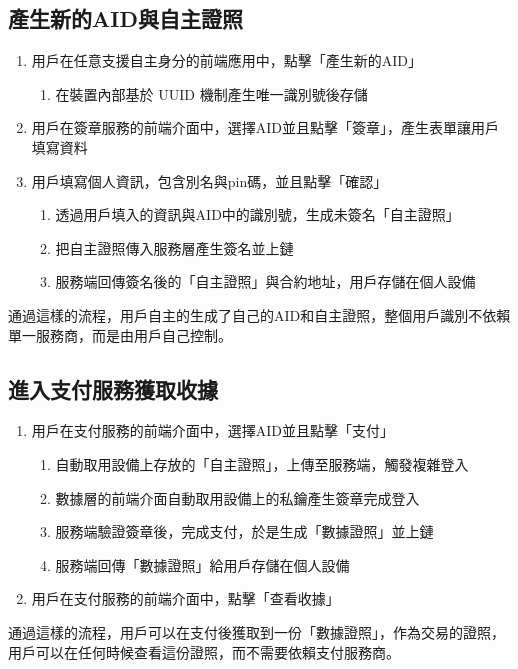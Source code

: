 \subsection{產生新的AID與自主證照}
\begin{enumerate}
  \item 用戶在任意支援自主身分的前端應用中，點擊「產生新的AID」
        \begin{enumerate}
          \item 在裝置內部基於 UUID 機制產生唯一識別號後存儲
        \end{enumerate}
  \item 用戶在簽章服務的前端介面中，選擇AID並且點擊「簽章」，產生表單讓用戶填寫資料
  \item 用戶填寫個人資訊，包含別名與pin碼，並且點擊「確認」
        \begin{enumerate}
          \item 透過用戶填入的資訊與AID中的識別號，生成未簽名「自主證照」
          \item 把自主證照傳入服務層產生簽名並上鏈
          \item 服務端回傳簽名後的「自主證照」與合約地址，用戶存儲在個人設備
        \end{enumerate}
\end{enumerate}
通過這樣的流程，用戶自主的生成了自己的AID和自主證照，整個用戶識別不依賴單一服務商，而是由用戶自己控制。
\subsection{進入支付服務獲取收據}
\begin{enumerate}
  \item 用戶在支付服務的前端介面中，選擇AID並且點擊「支付」
        \begin{enumerate}
          \item 自動取用設備上存放的「自主證照」，上傳至服務端，觸發複雜登入
          \item 數據層的前端介面自動取用設備上的私鑰產生簽章完成登入
          \item 服務端驗證簽章後，完成支付，於是生成「數據證照」並上鏈
          \item 服務端回傳「數據證照」給用戶存儲在個人設備
        \end{enumerate}
  \item 用戶在支付服務的前端介面中，點擊「查看收據」
\end{enumerate}
通過這樣的流程，用戶可以在支付後獲取到一份「數據證照」，作為交易的證照，用戶可以在任何時候查看這份證照，而不需要依賴支付服務商。
